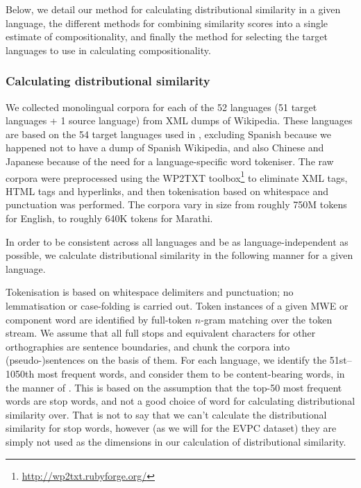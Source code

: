 \documentclass[output=paper
,modfonts
,nonflat]{langsci/langscibook}
\begin{document}
Below, we detail our method for calculating distributional similarity
in a given language, the different methods for combining similarity
scores into a single estimate of compositionality, and finally the
method for selecting the target languages to use in calculating
compositionality.


\subsubsection{Calculating distributional similarity\label{sec:ds:calculating}}

We collected monolingual corpora for each of the 52 languages (51 target
languages + 1 source language) from XML dumps of Wikipedia. These
languages are based on the 54 target languages used in
, excluding Spanish because we happened not to
have a dump of Spanish Wikipedia, and also Chinese and Japanese
because of the need for a language-specific word tokeniser. The raw
corpora were preprocessed using the WP2TXT
toolbox\footnote{\smaller\url{http://wp2txt.rubyforge.org/}} to
eliminate XML tags, HTML tags and hyperlinks, and then tokenisation
based on whitespace and punctuation was performed. The corpora vary in
size from roughly 750M tokens for English, to roughly 640K tokens for
Marathi.

In order to be consistent across all languages and be as
language-independent as possible, we calculate distributional
similarity in the following manner for a given language.

Tokenisation is based on whitespace delimiters and punctuation; no
lemmatisation or case-folding is carried out. Token instances of a
given MWE or component word are identified by full-token $n$-gram
matching over the token stream. We assume that all full stops and
equivalent characters for other orthographies are sentence boundaries,
and chunk the corpora into (pseudo-)sentences on the basis of
them. For each language, we identify the 51st--1050th most frequent
words, and consider them to be content-bearing words, in the manner of
\citet{Schutze:1997}. This is based on the assumption that the top-50
most frequent words are stop words, and not a good choice of word for
calculating distributional similarity over. That is not to say that we
can't calculate the distributional similarity for stop words, however
(as we will for the EVPC dataset) they are simply not used as the
dimensions in our calculation of distributional similarity.
\end{document}
